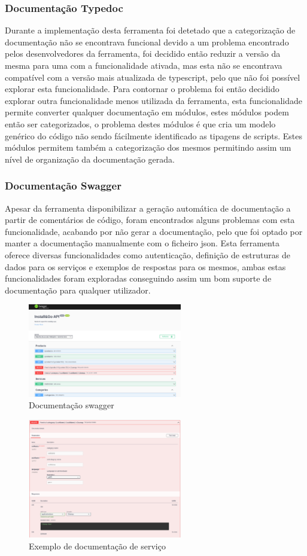 \subsubsection{Documentação Typedoc}
Durante a implementação desta ferramenta foi detetado que a categorização de documentação não se encontrava funcional devido a um problema encontrado pelos desenvolvedores da ferramenta, foi decidido então reduzir a versão da mesma para uma com a funcionalidade ativada, mas esta não se encontrava compatível com a versão mais atualizada de typescript, pelo que não foi possível explorar esta funcionalidade. Para contornar o problema foi então decidido explorar outra funcionalidade menos utilizada da ferramenta, esta funcionalidade permite converter qualquer documentação em módulos, estes módulos podem então ser categorizados, o problema destes módulos é que cria um modelo genérico do código não sendo fácilmente identificado as tipagens de scripts. Estes módulos permitem também a categorização dos mesmos permitindo assim um nível de organização da documentação gerada.

\newpage

\subsubsection{Documentação Swagger}
Apesar da ferramenta disponibilizar a geração automática de documentação a partir de comentários de código, foram encontrados alguns problemas com esta funcionalidade, acabando por não gerar a documentação, pelo que foi optado por manter a documentação manualmente com o ficheiro json. Esta ferramenta oferece diversas funcionalidades como autenticação, definição de estruturas de dados para os serviços e exemplos de respostas para os mesmos, ambas estas funcionalidades foram exploradas conseguindo assim um bom suporte de documentação para qualquer utilizador.

\begin{figure}[htb]
  \centering
  \includegraphics[width=0.6\textwidth]{images/implementacao/api/swagger_intro.png}
  \caption{Documentação swagger}
  \label{fig:66}
\end{figure}

\begin{figure}[htb]
  \centering
  \includegraphics[width=0.6\textwidth]{images/implementacao/api/swagger_pedido.png}
  \caption{Exemplo de documentação de serviço}
  \label{fig:67}
\end{figure}